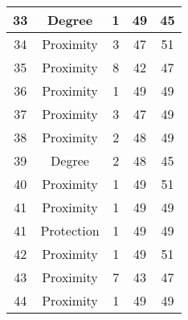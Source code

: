 \documentclass[results.tex]{subfiles}
\begin{document}
\begin{center}
\begin{tabular}{| c || c | c | c | c |}
            \hline
            33                      & Degree                       & 1                      & 49                      & 45                   \\
            \hline
            34                      & Proximity                    & 3                      & 47                      & 51                   \\
            \hline
            35                      & Proximity                    & 8                      & 42                      & 47                   \\
            \hline
            36                      & Proximity                    & 1                      & 49                      & 49                   \\
            \hline
            37                      & Proximity                    & 3                      & 47                      & 49                   \\
            \hline
            38                      & Proximity                    & 2                      & 48                      & 49                   \\
            \hline
            39                      & Degree                       & 2                      & 48                      & 45                   \\
            \hline
            40                      & Proximity                    & 1                      & 49                      & 51                   \\
            \hline
            41                      & Proximity                    & 1                      & 49                      & 49                   \\
            \hline
            41                      & Protection                   & 1                      & 49                      & 49                   \\
            \hline
            42                      & Proximity                    & 1                      & 49                      & 51                   \\
            \hline
            43                      & Proximity                    & 7                      & 43                      & 47                   \\
            \hline
            44                      & Proximity                    & 1                      & 49                      & 49                   \\

\end{tabular}
\end{center}
\end{document}
